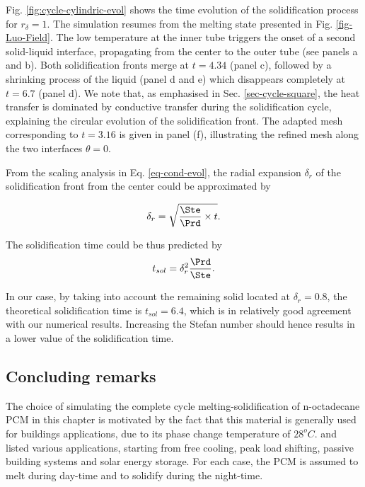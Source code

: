 Fig. \ref{fig:cycle-cylindric-evol} shows the time evolution of the solidification process for $r_{\delta} = 1$.
The simulation resumes from the melting state presented in Fig. \ref{fig-Luo-Field}.
The low temperature at the inner tube triggers the onset of a second solid-liquid interface, propagating from the center to the outer tube (see panels a and b).
Both solidification fronts merge  at $t = 4.34$ (panel c), followed by a shrinking process of the liquid (panel d and e) which disappears completely at $t = 6.7$ (panel d).
We note that, as emphasised in Sec. \ref{sec-cycle-square}, the heat transfer is dominated by conductive transfer during the solidification cycle, explaining the circular evolution of the solidification front.
The adapted mesh corresponding to $t = 3.16$ is given in panel (f), illustrating the refined mesh along the two interfaces $\theta = 0$.

From the scaling analysis in Eq. \eqref{eq-cond-evol}, the radial expansion $\delta_r$ of the solidification front from the center could be approximated by

\begin{equation}
	\delta_r = \sqrt{\frac{\Ste}{\Prd}\times t}.
\end{equation}

\noindent The solidification time could be thus predicted by
\begin{equation}
	t_{sol} = \delta_r^2 \frac{\Prd}{\Ste}.
\end{equation}

\noindent In our case, by taking into account the remaining solid located at $\delta_r = 0.8$, the theoretical solidification time is $t_{sol} = 6.4$, which is in relatively good agreement with our numerical results.
Increasing the Stefan number should hence results in a lower value of the  solidification time.


\subsection{Concluding remarks}
The choice of simulating the complete cycle melting-solidification of n-octadecane PCM in this chapter is motivated by the fact that this material is generally used for buildings applications, due to its phase change temperature of  $28^{o}C$.
\cite{zhu2009dynamic} and \cite{kalnaes2015phase} listed various applications, starting from free cooling, peak load shifting, passive building systems and solar energy storage.
For each case, the PCM is assumed to melt during day-time and to solidify during the night-time.

